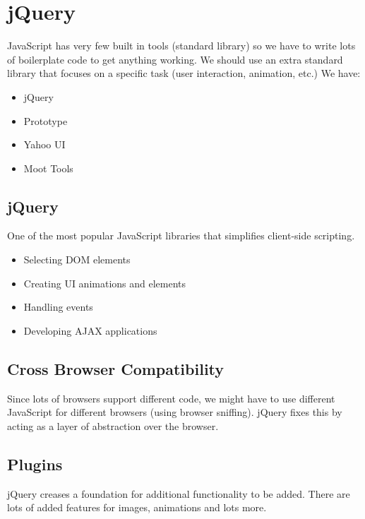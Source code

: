 \section{jQuery}\label{sec:jquery}

JavaScript has very few built in tools (standard library) so we have to write lots of boilerplate code to get anything working.
We should use an extra standard library that focuses on a specific task (user interaction, animation, etc.)
We have:
\begin{itemize}
    \item jQuery
    \item Prototype
    \item Yahoo UI
    \item Moot Tools
\end{itemize}

\subsection{jQuery}\label{sub:jquery}

One of the most popular JavaScript libraries that simplifies client-side scripting.
\begin{itemize}
    \item Selecting DOM elements
    \item Creating UI animations and elements
    \item Handling events
    \item Developing AJAX applications
\end{itemize}

\subsection{Cross Browser Compatibility}\label{sub:cross_browser_compatibility}

Since lots of browsers support different code, we might have to use different JavaScript for different browsers (using browser sniffing).
jQuery fixes this by acting as a layer of abstraction over the browser.

\subsection{Plugins}\label{sub:plugins}

jQuery creases a foundation for additional functionality to be added.
There are lots of added features for images, animations and lots more.

